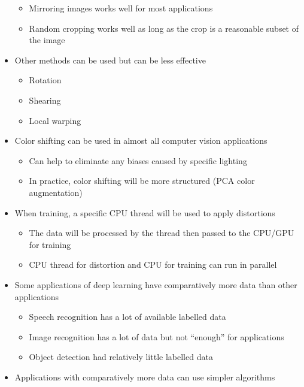 \documentclass[12pt, letterpaper]{article}
\begin{document}
\begin{itemize}
        \begin{itemize}
            \item Mirroring images works well for most applications
            \item Random cropping works well as long as the crop is a reasonable subset of the image 
        \end{itemize}
        \item Other methods can be used but can be less effective
        \begin{itemize}
            \item Rotation
            \item Shearing
            \item Local warping
        \end{itemize}
        \item Color shifting can be used in almost all computer vision applications
        \begin{itemize}
            \item Can help to eliminate any biases caused by specific lighting
            \item In practice, color shifting will be more structured (PCA color augmentation)
        \end{itemize}
        \item When training, a specific CPU thread will be used to apply distortions
        \begin{itemize}
            \item The data will be processed by the thread then passed to the CPU/GPU for training
            \item CPU thread for distortion and CPU for training can run in parallel
        \end{itemize}
        \item Some applications of deep learning have comparatively more data than other applications
        \begin{itemize}
            \item Speech recognition has a lot of available labelled data
            \item Image recognition has a lot of data but not ``enough'' for applications
            \item Object detection had relatively little labelled data
        \end{itemize}
        \item Applications with comparatively more data can use simpler algorithms
        \begin{itemize}

\end{itemize}
\end{itemize}
\end{document}
